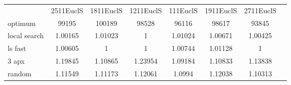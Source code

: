 \begin{tabular}[ht]{|l||c|c|c|c|c|c|H}
 & 2511EuclS & 1811EuclS & 1211EuclS & 111EuclS & 1911EuclS & 2711EuclS & \\  
optimum &99195 & 100189 & 98528 & 96116 & 98617 & 93845 & \\ 
local search &1.00165 & 1.01023 & 1 & 1.01024 & 1.00671 & 1.00425 & \\ 
ls fast &1.00605 & 1 & 1 & 1.00744 & 1.01128 & 1 & \\ 
3 apx &1.19845 & 1.10865 & 1.23954 & 1.09184 & 1.10833 & 1.13838 & \\ 
random &1.11549 & 1.11173 & 1.12061 & 1.0994 & 1.12038 & 1.10313 & \\ 
\end{tabular}